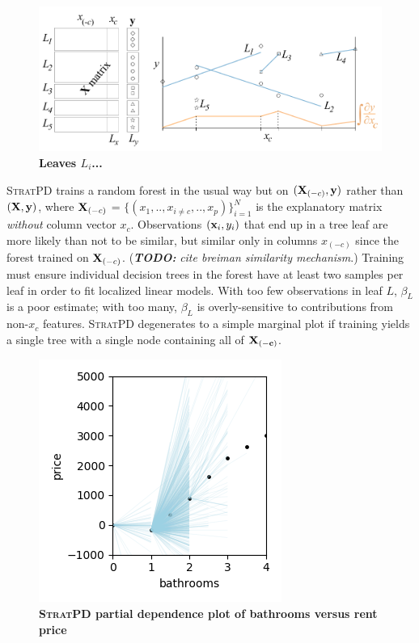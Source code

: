 \documentclass[12pt]{article}
\newcommand{\todo}[1]{{\bf\em TODO:} {\em #1}}
\newcommand{\spd}{\fontfamily{cmr}\textsc{\small StratPD}}
\begin{document}
\begin{figure}[htbp]
\begin{center}
\includegraphics[scale=0.7]{images/leaves.pdf}
\caption{{\bf  Leaves $L_i$...}}
\label{fig:leaves}
\end{center}
\end{figure}

\spd{} trains a random forest in the usual way but on $({\bf X}_{(-c)}, {\bf y})$ rather than $({\bf X}, {\bf y})$, where ${\bf X}_{(-c)}$ = $\{(x_1, .., x_{i \neq c}, .., x_p)\}_{i=1}^N$ is the explanatory matrix {\em without} column vector $x_c$.  Observations $({\bf x}_{i}, y_i)$ that end up in a tree leaf are more likely than not to be similar, but similar only in columns $x_{(-c)}$ since the forest trained on ${\bf X}_{(-c)}$. (\todo{cite breiman similarity mechanism}.)   Training must ensure individual decision trees in the forest have at least two samples per leaf in order to fit localized linear models. With too few observations in leaf $L$, $\beta_L$ is a poor estimate; with too many, $\beta_L$ is overly-sensitive to contributions from non-$x_c$ features. \spd{} degenerates to a simple marginal plot if training yields a single tree with a single node containing all of $\bf X_{(-c)}$.  

\begin{figure}[htbp]
\begin{center}
\includegraphics[scale=0.7]{images/bathrooms_vs_price_stratpd.png}
\caption{{\bf  \spd{} partial dependence plot of bathrooms versus rent price}}
\label{fig:baths_price_stratpd}
\end{center}
\end{figure}
\end{document}
